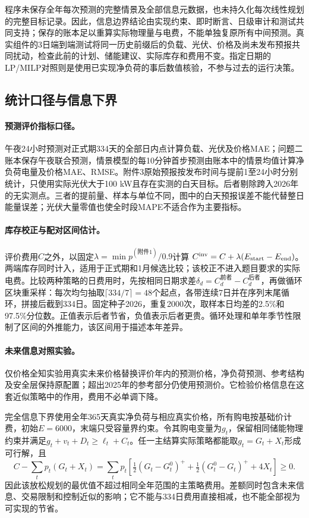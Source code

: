 程序未保存全年每次预测的完整情景及全部信息元数据，也未持久化每次线性规划的完整目标记录。因此，信息边界结论由实现约束、即时断言、日级审计和测试共同支持；保存的账本足以重算实际物理量与电费，不能单独复原所有中间预测。真实组件的3日端到端测试将同一历史前缀后的负载、光伏、价格及尚未发布预报共同扰动，检查此前的计划、储能建议、实际库存和费用不变。指定日期的LP/MILP对照则是使用已实现净负荷的事后数值核验，不参与过去的运行决策。

\subsection{统计口径与信息下界}
\label{app:statistics}

\paragraph{预测评价指标口径。}
午夜24小时预测对正式期334天的全部日内点计算负载、光伏及价格MAE；问题二账本保存午夜联合预测，情景模型的每10分钟首步预测由账本中的情景均值计算净负荷电量及价格MAE、RMSE。附件3原始预报按发布时间与提前1至24小时分别统计，只使用实际光伏大于100 kW且存在实测的白天目标。后者剔除跨入2026年的无实测点。三者的提前量、样本与单位不同，图中的白天预报误差不能代替整日能量误差；光伏大量零值也使全时段MAPE不适合作为主要指标。

\paragraph{库存校正与配对区间估计。}
评价费用$C$之外，以固定$\lambda=\min p^{(\text{附件1})}/0.9$计算
$C^{\rm inv}=C+\lambda(E_{\rm start}-E_{\rm end})$。
两端库存同时计入，适用于正式期和1月候选比较；该校正不进入题目要求的实际电费。比较两种策略的日费用时，先按相同日期求差$\delta_d=C_d^{\text{前者}}-C_d^{\text{后者}}$，再做循环区块重采样：每次均匀抽取$\lceil334/7\rceil=48$个起点，各带连续7日并在序列末尾循环，拼接后截到334日。固定种子2026，重复2000次，取样本日均差的2.5\%和97.5\%分位数。正值表示后者节省，负值表示后者更贵。循环处理和单年季节性限制了区间的外推能力，该区间用于描述本年差异。

\paragraph{未来信息对照实验。}
仅价格全知实验用真实未来价格替换评价年内的预测价格，净负荷预测、参考结构及安全层保持原配置；超出2025年的参考部分仍使用预测价。它检验价格信息在这套近似策略中的作用，费用不必单调下降。

完全信息下界使用全年365天真实净负荷与相应真实价格，所有购电按基础价计费，初始$E=6000$，末端只受容量界约束。令其购电变量为$g_t$，保留相同储能物理约束并满足$g_t+v_t+D_t\ge\ell_t+C_t$。任一主结算实际策略都能取$g_t=G_t+X_t$形成可行解，且
\begin{equation}
 C-\sum_t p_t(G_t+X_t)
 =\sum_t p_t\left[\tfrac12(G_t-G_t^0)^+
                  +\tfrac12(G_t^0-G_t)^++4X_t\right]\ge0.
\end{equation}
因此该放松规划的最优值不超过相同全年范围的主策略费用。差额同时包含未来信息、交易限制和控制近似的影响；它不能与334日费用直接相减，也不能全部视为可实现的节省。

